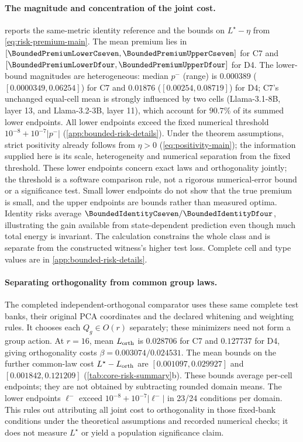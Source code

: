 \paragraph{The magnitude and concentration of the joint cost.}
 reports the same-metric identity reference and the bounds on $L^\star-\eta$ from \cref{eq:risk-premium-main}. The mean premium lies in $[\BoundedPremiumLowerCseven,\BoundedPremiumUpperCseven]$ for C7 and $[\BoundedPremiumLowerDfour,\BoundedPremiumUpperDfour]$ for D4. The lower-bound magnitudes are heterogeneous: median $p^-$ (range) is $0.000389$ ($[0.0000349,0.06254]$) for C7 and $0.01876$ ($[0.00254,0.08719]$) for D4; C7's unchanged equal-cell mean is strongly influenced by two cells (Llama-3.1-8B, layer 13, and Llama-3.2-3B, layer 11), which account for $90.7\%$ of its summed lower endpoints. All \BoundedAllPositive{} lower endpoints exceed the fixed numerical threshold $10^{-8}+10^{-7}|p^-|$ (\cref{app:bounded-risk-details}). Under the theorem assumptions, strict positivity already follows from $\eta>0$ (\cref{eq:positivity-main}); the information supplied here is its scale, heterogeneity and numerical separation from the fixed threshold. These lower endpoints concern exact laws and orthogonality jointly; the threshold is a software comparison rule, not a rigorous numerical-error bound or a significance test. Small lower endpoints do not show that the true premium is small, and the upper endpoints are bounds rather than measured optima. Identity risks average $\BoundedIdentityCseven/\BoundedIdentityDfour$, illustrating the gain available from state-dependent prediction even though much total energy is invariant. The calculation constrains the whole class and is separate from the constructed witness's higher test loss. Complete cell and type values are in \cref{app:bounded-risk-details}.

\paragraph{Separating orthogonality from common group laws.}
\label{par:orthogonal-results}
The completed independent-orthogonal comparator uses these same complete test banks, their original PCA coordinates and the declared whitening and weighting rules. It chooses each $Q_g\in O(r)$ separately; these minimizers need not form a group action. At $r=16$, mean $L_{\rm orth}$ is $0.028706$ for C7 and $0.127737$ for D4, giving orthogonality costs $\beta=0.003074/0.024531$. The mean bounds on the further common-law cost $L^\star-L_{\rm orth}$ are $[0.001097,0.029927]$ and $[0.001842,0.121209]$ (\cref{tab:core-risk-summary}b). These bounds average per-cell endpoints; they are not obtained by subtracting rounded domain means. The lower endpoints $\ell^-$ exceed $10^{-8}+10^{-7}|\ell^-|$ in 23/24 conditions per domain. This rules out attributing all joint cost to orthogonality in those fixed-bank conditions under the theoretical assumptions and recorded numerical checks; it does not measure $L^\star$ or yield a population significance claim.


